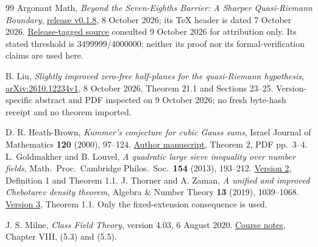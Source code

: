 \documentclass[12pt]{article}
\begin{document}
\begin{thebibliography}{99}
Argonaut Math,
\emph{Beyond the Seven-Eighths Barrier: A Sharper Quasi-Riemann Boundary},
\href{https://github.com/Argonaut-Math/argonaut-math-quasi-riemann-boundary/releases/tag/v0.1.8}{release v0.1.8},
8 October 2026; its TeX header is dated 7 October 2026.
\href{https://raw.githubusercontent.com/Argonaut-Math/argonaut-math-quasi-riemann-boundary/v0.1.8/preprints/Beyond_the_Seven_Eighths_Barrier.tex}{Release-tagged source}
consulted 9 October 2026 for attribution only.
Its stated threshold is \(3499999/4000000\); neither its proof nor
its formal-verification claims are used here.

B. Liu, \emph{Slightly improved zero-free half-planes for the
quasi-Riemann hypothesis},
\href{https://arxiv.org/pdf/2610.12234v1}{arXiv:2610.12234v1},
8 October 2026, Theorem 21.1 and Sections 23--25.
Version-specific abstract and PDF inspected on 9 October 2026;
no fresh byte-hash receipt and no theorem imported.

D. R. Heath-Brown,
\emph{Kummer's conjecture for cubic Gauss sums},
Israel Journal of Mathematics \textbf{120} (2000), 97--124.
\href{https://ora.ox.ac.uk/objects/uuid:16c3966e-61cb-499d-839c-559b3794fcff/files/m502494cff282fae8a90f44a466f2b941}{Author manuscript},
Theorem 2, PDF pp.\ 3--4.
L. Goldmakher and B. Louvel,
\emph{A quadratic large sieve inequality over number fields},
Math.\ Proc.\ Cambridge Philos.\ Soc.\ \textbf{154} (2013), 193--212.
\href{https://arxiv.org/pdf/1112.1642v2}{Version 2},
Definition 1 and Theorem 1.1.
J. Thorner and A. Zaman,
\emph{A unified and improved Chebotarev density theorem},
Algebra \& Number Theory \textbf{13} (2019), 1039--1068.
\href{https://arxiv.org/pdf/1803.02823v3}{Version 3},
Theorem 1.1.  Only the fixed-extension consequence is used.

J. S. Milne,
\emph{Class Field Theory}, version 4.03, 6 August 2020.
\href{https://www.jmilne.org/math/CourseNotes/CFT.pdf}{Course notes},
Chapter VIII, (5.3) and (5.5).
\end{thebibliography}
\end{document}
